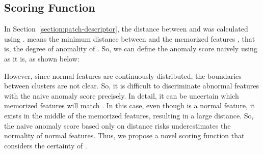 \documentclass[10pt,twocolumn,letterpaper]{article}
\begin{document}
    \subsection{Scoring Function} \label{section:scoring-function}
        In Section~\ref{section:patch-descriptor}, the distance between  and  was calculated using .  means the minimum distance between  and the memorized features , that is, the degree of anomality of . So, we can define the anomaly score naively using  as it is, as shown below:
        
        However, since normal features are continuously distributed, the boundaries between clusters are not clear. So, it is difficult to discriminate abnormal features with the naive anomaly score precisely. In detail, it can be uncertain which memorized features will match .
        In this case, even though  is a normal feature, it exists in the middle of the memorized features, resulting in a large distance. So, the naive anomaly score based only on distance risks underestimates the normality of normal features. Thus, we propose a novel scoring function that considers the certainty of .
        
\end{document}
